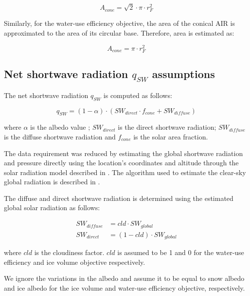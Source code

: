 \documentclass[tc, manuscript]{copernicus}
\begin{document}
\begin{equation} A_{cone} =\sqrt{2} \cdot \pi \cdot r_{F}^2  \end{equation}

Similarly, for the water-use efficiency objective, the area of the conical AIR is approximated to the area of
its circular base. Therefore, area is estimated as:

\begin{equation} A_{cone} =\pi \cdot r_{F}^2  \end{equation}

\subsection{Net shortwave radiation \texorpdfstring{$q_{SW}$}{Lg} assumptions}
\label{sec:SW}

The net shortwave radiation $q_{SW}$ is computed as follows:

\begin{equation} 
q_{SW} = (1- \alpha) \cdot ( SW_{direct} \cdot f_{cone} + SW_{diffuse})
\label{eqn:SW} 
\end{equation}

where $\alpha$ is the albedo value ; $SW_{direct}$ is the direct shortwave radiation; $SW_{diffuse}$ is the
diffuse shortwave radiation and $f_{cone}$ is the solar area fraction.

The data requirement was reduced by estimating the global shortwave radiation and pressure directly using the
location's coordinates and altitude through the solar radiation model described in
\citet{holmgrenPvlibPythonPython2018}. The algorithm used to estimate the clear-sky global radiation is
described in \citet{ineichenBroadbandSimplifiedVersion2008}.  

The diffuse and direct shortwave radiation is determined using the estimated global solar radiation as follows:

\begin{equation}
\begin{split}
  SW_{diffuse} &= cld \cdot SW_{global}\\
  SW_{direct} &= (1-cld) \cdot SW_{global}
\end{split}
\end{equation}

where $cld$ is the cloudiness factor. $cld$ is assumed to be 1 and 0 for the water-use efficiency and ice volume
objective respectively.

We ignore the variations in the albedo and assume it to be equal to snow albedo and ice albedo for the  ice
volume and water-use efficiency objective, respectively.
\end{document}
